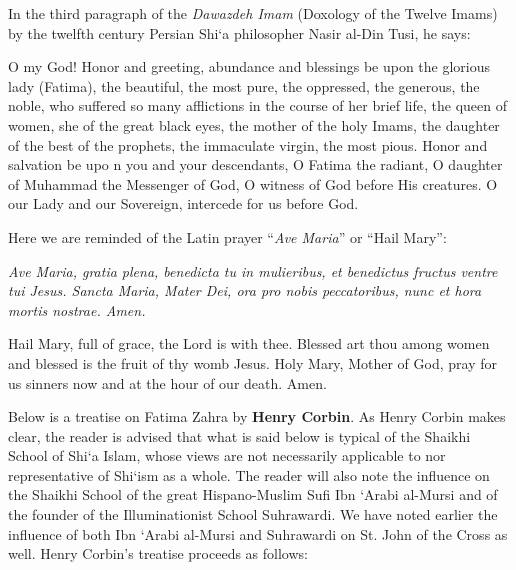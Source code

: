 In the third paragraph of the \emph{Dawazdeh Imam} (Doxology of the Twelve Imams) by the twelfth century Persian Shi`a philosopher Nasir al-Din Tusi, he says:

\begin{quotex}
O my God! Honor and greeting, abundance and blessings be upon the glorious lady (Fatima), the beautiful, the most pure, the oppressed, the generous, the noble, who suffered so many afflictions in the course of her brief life, the queen of women, she of the great black eyes, the mother of the holy Imams, the daughter of the best of the prophets, the immaculate virgin, the most pious. Honor and salvation be upo n you and your descendants, O Fatima the radiant, O daughter of Muhammad the Messenger of God, O witness of God before His creatures. O our Lady and our Sovereign, intercede for us before God.
\end{quotex}


Here we are reminded of the Latin prayer ``\emph{Ave Maria}'' or ``Hail Mary'':

\begin{quotex}
\emph{Ave Maria, gratia plena, benedicta tu in mulieribus, et benedictus 
fructus ventre tui Jesus. Sancta Maria, Mater Dei, ora pro nobis peccatoribus, nunc et hora mortis nostrae. Amen.}

Hail Mary, full of grace, the Lord is with thee. Blessed art thou among women and blessed is the fruit of thy womb Jesus. Holy Mary, Mother of God, pray for us sinners now and at the hour of our death. Amen.
\end{quotex}


Below is a treatise on Fatima Zahra by \textbf{Henry Corbin}. As Henry Corbin makes clear, the reader is advised that what is said below is typical of the Shaikhi School of Shi`a Islam, whose views are not necessarily applicable to nor representative of Shi`ism as a whole. The reader will also note the influence on the Shaikhi School of the great Hispano-Muslim Sufi Ibn `Arabi al-Mursi and of the founder of the Illuminationist School Suhrawardi. We have noted earlier the influence of both Ibn `Arabi al-Mursi and Suhrawardi on St. John of the Cross as well. Henry Corbin's treatise proceeds as follows:

